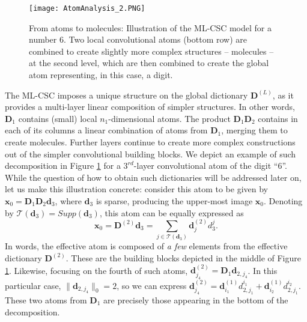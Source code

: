 \documentclass[10pt,journal]{IEEEtran}
\def\x{{\mathbf x}}
\def\d{{\mathbf d}}
\def\D{{\mathbf D}}
\theoremstyle{plain}
\theoremstyle{definition}
\begin{document}
\begin{figure}
\begin{center}
	\texttt{[image: AtomAnalysis\_2.PNG]}
	\caption{From atoms to molecules: Illustration of the ML-CSC model for a number 6. Two local convolutional atoms (bottom row) are combined to create slightly more complex structures -- molecules -- at the second level, which are then combined to create the global atom representing, in this case, a digit.
	}
	\label{Fig:atomDecomposition}
\end{center}
\end{figure}

The ML-CSC imposes a unique structure on the global dictionary $\D^{(L)}$, as it provides a multi-layer linear composition of simpler structures. In other words, $\D_1$ contains (small) local $n_1$-dimensional atoms. The product $\D_1\D_2$ contains in each of its columns a linear combination of atoms from $\D_1$, merging them to create molecules. Further layers continue to create more complex constructions out of the simpler convolutional building blocks. We depict an example of such decomposition in Figure \ref{Fig:atomDecomposition} for a $3^{rd}$-layer convolutional atom of the digit ``6''. While the question of how to obtain such dictionaries will be addressed later on, let us make this illustration concrete: consider this atom to be given by $\x_0 = \D_1\D_2\d_3$, where $\d_3$ is sparse, producing the upper-most image $\x_0$. Denoting by $\mathcal{T}(\d_3) = Supp(\d_3)$, this atom can be equally expressed as 
\begin{equation}
	\x_0 = \D^{(2)}\d_3 = \sum_{j\in \mathcal{T}(\d_3)} \d^{(2)}_j d^j_{3}.
\end{equation}
In words, the effective atom is composed of \emph{a few} elements from the effective dictionary $\D^{(2)}$. These are the building blocks depicted in the middle of Figure \ref{Fig:atomDecomposition}. Likewise, focusing on the fourth of such atoms, $\d^{(2)}_{j_4} = \D_1 \d_{2,j_4}$. In this particular case, $\|\d_{2,j_4}\|_0 = 2$, so we can express %
$\d^{(2)}_{j_4} =  \d^{(1)}_{i_1} d^{i_1}_{2,j_1} + \d^{(1)}_{i_2} d^{i_2}_{2,j_1}$.
These two atoms from $\D_1$ are precisely those appearing in the bottom of the decomposition.
\end{document}
